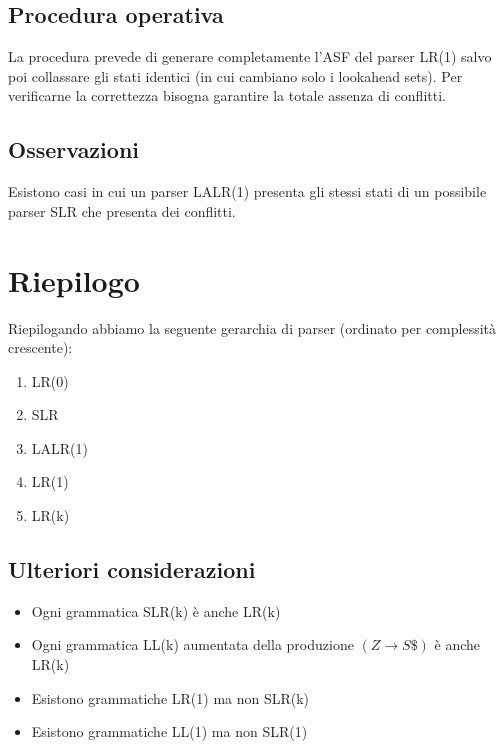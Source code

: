 \documentclass[a4paper, fleqn]{report}
\begin{document}
\section{Procedura operativa}
La procedura prevede di generare completamente l'ASF del parser LR(1) salvo poi collassare gli stati identici (in cui cambiano solo i lookahead sets).
Per verificarne la correttezza bisogna garantire la totale assenza di conflitti.

\section{Osservazioni}
Esistono casi in cui un parser LALR(1) presenta gli stessi stati di un possibile parser SLR che presenta dei conflitti.

\chapter{Riepilogo}
Riepilogando abbiamo la seguente gerarchia di parser (ordinato per complessità crescente):
\begin{enumerate}
\item LR(0)
\item SLR
\item LALR(1)
\item LR(1)
\item LR(k)
\end{enumerate}

\section{Ulteriori considerazioni}
\begin{itemize}
\item Ogni grammatica SLR(k) è anche LR(k)
\item Ogni grammatica LL(k) aumentata della produzione \((Z \rightarrow S\$)\) è anche LR(k)
\item Esistono grammatiche LR(1) ma non SLR(k)
\item Esistono grammatiche LL(1) ma non SLR(1)
\end{itemize}
\end{document}
